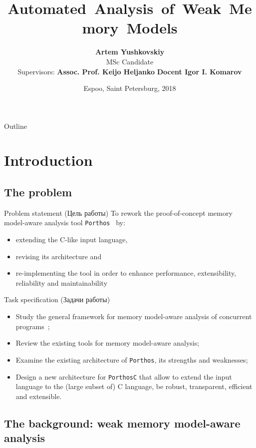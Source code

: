 \documentclass{beamer}
\title{\nohyphens{\textbf{Automated~Analysis~of~Weak~Memory~Models}}}
\author{\textbf{Artem Yushkovskiy}\inst{1,2} \\ 
{\scriptsize MSc Candidate}
\\ \vspace{1em}
{\footnotesize\raggedleft Supervisors: \textbf{Assoc. Prof. Keijo Heljanko}\inst{1} \newline
\hphantom{Supervis} \textbf{Docent Igor I. Komarov}\inst{2} }
}%
\institute %
{
  \inst{1}%
  Department of Computer Science, \\
  School of Science, \\
  \textbf{Aalto University} (Espoo, Finland)%
  \and
  \inst{2}%
  Faculty of Information Security \\
  and Computer Technologies, \\
  \textbf{ITMO University} (Saint Petersburg, Russia)%
}
\date{\scriptsize Espoo, Saint Petersburg, 2018}
\begin{document}
\begin{frame}
  \titlepage
\end{frame}

\begin{frame}{Outline}
  \tableofcontents
\end{frame}




\section{Introduction}

\subsection{The problem}


\begin{frame}{Problem statement (Цель работы)}
To rework the proof-of-concept memory model-aware analysis tool \texttt{Porthos}~\cite{Porthos17a} by:
\begin{itemize}
\item extending the C-like input language,
\item revising its architecture and
\item re-implementing the tool in order to enhance performance, extensibility, reliability and maintainability
\end{itemize}
\end{frame}


\begin{frame}{Task specification (Задачи работы)}
\begin{itemize}
\item Study the general framework for memory model-aware analysis of concurrent programs~\cite{alglave2010shared};
\item Review the existing tools for memory model-aware analysis;
\item Examine the existing architecture of \texttt{Porthos}, its strengths and weaknesses;
\item Design a new architecture for \texttt{PorthosC} that allow to extend the input language to the (large subset of) C language, be robust, transparent, efficient and extensible.
\end{itemize}
\end{frame}


\subsection{The background: weak memory model-aware analysis}
\end{document}
